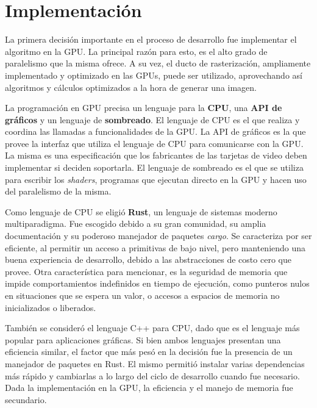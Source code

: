 \graphicspath{{chapters/4_implementación/figures}}

\chapter{Implementación}\label{chap:implementation}

La primera decisión importante en el proceso de desarrollo fue implementar el algoritmo en la GPU.
La principal razón para esto, es el alto grado de paralelismo que la misma ofrece.
A su vez, el ducto de rasterización, ampliamente implementado y optimizado en las GPUs, puede ser utilizado, aprovechando así algoritmos y cálculos optimizados a la hora de generar una imagen.

La programación en GPU precisa un lenguaje para la \textbf{CPU}, una \textbf{API de gráficos} y un lenguaje de \textbf{sombreado}.
El lenguaje de CPU es el que realiza y coordina las llamadas a funcionalidades de la GPU.
La API de gráficos es la que provee la interfaz que utiliza el lenguaje de CPU para comunicarse con la GPU.
La misma es una especificación que los fabricantes de las tarjetas de video deben implementar si deciden soportarla.
El lenguaje de sombreado es el que se utiliza para escribir los \textit{shaders}, programas que ejecutan directo en la GPU y hacen uso del paralelismo de la misma.

Como lenguaje de CPU se eligió \textbf{Rust}, un lenguaje de sistemas moderno multiparadigma.
Fue escogido debido a su gran comunidad, su amplia documentación y su poderoso manejador de paquetes \textit{cargo}.  
Se caracteriza por ser eficiente, al permitir un acceso a primitivas de bajo nivel, pero manteniendo una buena experiencia de desarrollo, debido a las abstracciones de costo cero que provee.
Otra característica para mencionar, es la seguridad de memoria que impide comportamientos indefinidos en tiempo de ejecución, como punteros nulos en situaciones que se espera un valor, o accesos a espacios de memoria no inicializados o liberados.

También se consideró el lenguaje C++ para CPU, dado que es el lenguaje más popular para aplicaciones gráficas.  
Si bien ambos lenguajes presentan una eficiencia similar, el factor que más pesó en la decisión fue la presencia de un manejador de paquetes en Rust.
El mismo permitió instalar varias dependencias más rápido y cambiarlas a lo largo del ciclo de desarrollo cuando fue necesario.
Dada la implementación en la GPU, la eficiencia y el manejo de memoria fue secundario. 

